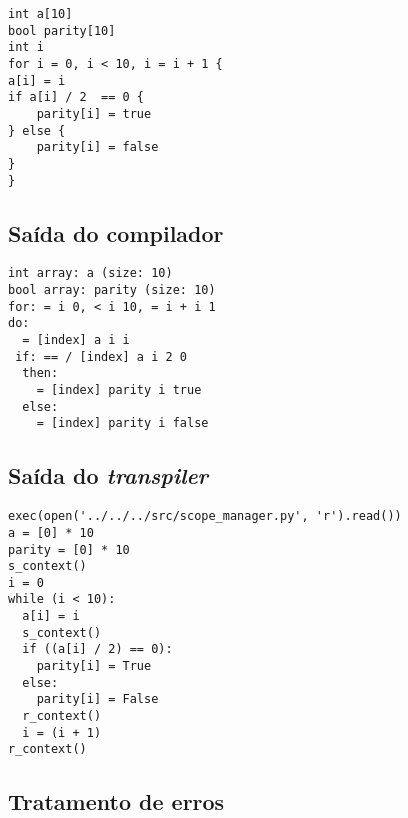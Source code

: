 \documentclass{sftex/sftex}
\begin{document}
\begin{verbatim}
int a[10]
bool parity[10]
int i
for i = 0, i < 10, i = i + 1 {
a[i] = i
if a[i] / 2  == 0 {
    parity[i] = true
} else {
    parity[i] = false
}
}
\end{verbatim}

\subsection{Saída do compilador}

\begin{verbatim}
int array: a (size: 10)
bool array: parity (size: 10)
for: = i 0, < i 10, = i + i 1
do:
  = [index] a i i
 if: == / [index] a i 2 0
  then:
    = [index] parity i true
  else:
    = [index] parity i false
\end{verbatim}

\subsection{Saída do \emph{transpiler}}

\begin{verbatim}
exec(open('../../../src/scope_manager.py', 'r').read())
a = [0] * 10
parity = [0] * 10
s_context()
i = 0
while (i < 10):
  a[i] = i
  s_context()
  if ((a[i] / 2) == 0):
    parity[i] = True
  else:
    parity[i] = False
  r_context()
  i = (i + 1)
r_context()
\end{verbatim}

\subsection{Tratamento de erros}
\end{document}
